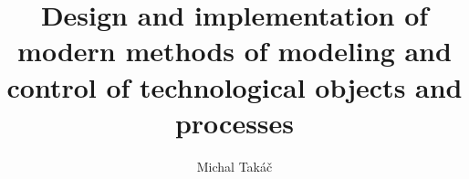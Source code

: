 \documentclass[]{tukethesis}
\author{Michal Takáč}
\title{Design and implementation of modern methods of modeling and control of technological objects and processes}
\subtitle{}
\begin{document}
\renewcommand\theHfigure{\theHsection.\arabic{figure}}
\renewcommand\theHtable{\theHsection.\arabic{table}}

\firstpage

\titlepage


%
%

\abstrakte %

\abstrakt %

\endabstract %



\end{document}
